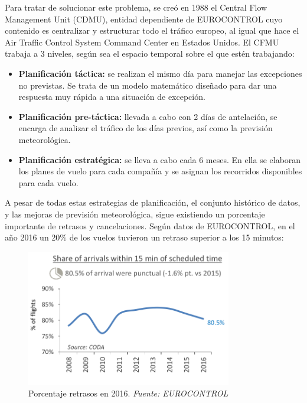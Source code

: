 Para tratar de solucionar este problema, se creó en 1988 el Central Flow Management Unit (CDMU), entidad dependiente de EUROCONTROL cuyo contenido es centralizar y estructurar todo el tráfico europeo, al igual que hace el Air Traffic Control System Command Center en Estados Unidos. El CFMU trabaja a 3 niveles, según sea el espacio temporal sobre el que estén trabajando:
\begin{itemize}
	\item \textbf{Planificación táctica:} se realizan el mismo día para manejar las excepciones no previstas. Se trata de un modelo matemático diseñado para dar una respuesta muy rápida a una situación de excepción.
	\item \textbf{Planificación pre-táctica:} llevada a cabo con 2 días de antelación, se encarga de analizar el tráfico de los días previos, así como la previsión meteorológica.
	\item \textbf{Planificación estratégica: }se lleva a cabo cada 6 meses. En ella se elaboran los planes de vuelo para cada compañía y se asignan los recorridos disponibles para cada vuelo.
\end{itemize}


	
A pesar de todas estas estrategias de planificación, el conjunto histórico de datos, y las mejoras de previsión meteorológica, sigue existiendo un porcentaje importante de retrasos y cancelaciones. Según datos de EUROCONTROL, en el año 2016 un 20\% de los vuelos tuvieron un retraso superior a los 15 minutos:
\begin{figure}[h]
	\begin{center}
		\centering
		\includegraphics[width=0.8\textwidth]{./imagenes/introduccion/retrasos.png}
		\caption{Porcentaje retrasos en 2016. \textit{Fuente: EUROCONTROL}}
		\label{fig: Porcentaje retrasos en 2016}
	\end{center}
\end{figure}

